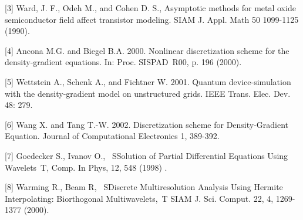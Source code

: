 \documentclass{report}
\begin{document}
[3] Ward, J. F., Odeh M., and Cohen D. S., Asymptotic methods for metal
oxide semiconductor field affect transistor modeling. SIAM J. Appl.
Math 50 1099-1125 (1990).

[4] Ancona M.G. and Biegel B.A. 2000. Nonlinear discretization scheme
for the density-gradient equations. In: Proc. SISPAD~R00, p. 196
(2000).

[5] Wettstein A., Schenk A., and Fichtner W. 2001. Quantum
device-simulation with the density-gradient model on unstructured
grids. IEEE Trans. Elec. Dev. 48: 279.

[6] Wang X. and Tang T.-W. 2002. Discretization scheme for
Density-Gradient Equation. Journal of Computational Electronics 1,
389-392.

[7] Goedecker S., Ivanov O., ~SSolution of Partial Differential
Equations Using Wavelets~T, Comp. In Phys, 12, 548 (1998) .

[8] Warming R., Beam R, ~SDiscrete Multiresolution Analysis Using
Hermite Interpolating: Biorthogonal Multiwavelets,~T SIAM J. Sci.
Comput. 22, 4, 1269-1377 (2000).
\end{document}
